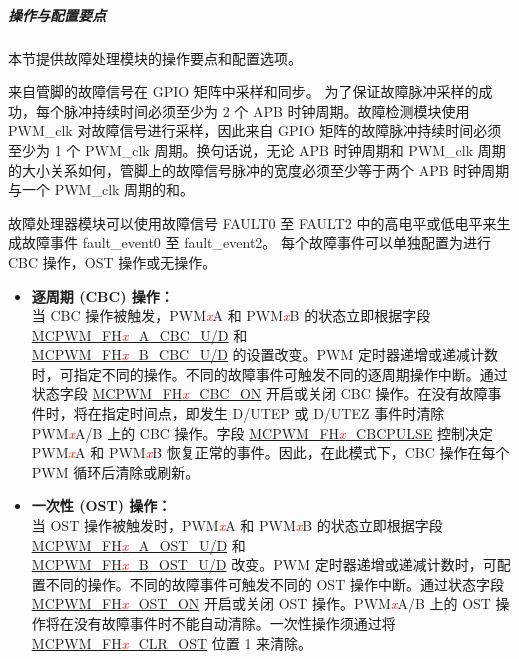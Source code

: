 \documentclass[main\_\_CN.tex]{subfiles}
\begin{document}
\subparagraph{操作与配置要点}
本节提供故障处理模块的操作要点和配置选项。

来自管脚的故障信号在 GPIO 矩阵中采样和同步。 为了保证故障脉冲采样的成功，每个脉冲持续时间必须至少为 2 个 APB 时钟周期。故障检测模块使用 PWM\_clk 对故障信号进行采样，因此来自 GPIO 矩阵的故障脉冲持续时间必须至少为 1 个 PWM\_clk 周期。换句话说，无论 APB 时钟周期和 PWM\_clk 周期的大小关系如何，管脚上的故障信号脉冲的宽度必须至少等于两个 APB 时钟周期与一个 PWM\_clk 周期的和。

故障处理器模块可以使用故障信号 FAULT0 至 FAULT2 中的高电平或低电平来生成故障事件 fault\_event0 至 fault\_event2。 每个故障事件可以单独配置为进行 CBC 操作，OST 操作或无操作。

\begin{itemize}
    \item {\bfseries 逐周期 (CBC) 操作：}\\
    当 CBC 操作被触发，PWM\textcolor{red}{\it{x}}A 和 PWM\textcolor{red}{\it{x}}B 的状态立即根据字段 \hyperref[fielddesc:MCPWMFH0ACBCU]{MCPWM\_FH\textcolor{red}{\it{x}}\_A\_CBC\_U/D} 和 \\\hyperref[fielddesc:MCPWMFH0BCBCU]{MCPWM\_FH\textcolor{red}{\it{x}}\_B\_CBC\_U/D} 的设置改变。PWM 定时器递增或递减计数时，可指定不同的操作。不同的故障事件可触发不同的逐周期操作中断。通过状态字段 \hyperref[fielddesc:MCPWMFH0CBCON]{MCPWM\_FH\textcolor{red}{\it{x}}\_CBC\_ON} 开启或关闭 CBC 操作。在没有故障事件时，将在指定时间点，即发生 D/UTEP 或 D/UTEZ 事件时清除 PWM\textcolor{red}{\it{x}}A/B 上的 CBC 操作。字段 \hyperref[fielddesc:MCPWMFH0CBCPULSE]{MCPWM\_FH\textcolor{red}{\it{x}}\_CBCPULSE} 控制决定 PWM\textcolor{red}{\it{x}}A 和 PWM\textcolor{red}{\it{x}}B 恢复正常的事件。因此，在此模式下，CBC 操作在每个 PWM 循环后清除或刷新。
    \item {\bfseries 一次性 (OST) 操作：}\\
	当 OST 操作被触发时，PWM\textcolor{red}{\it{x}}A 和 PWM\textcolor{red}{\it{x}}B 的状态立即根据字段 \hyperref[fielddesc:MCPWMFH0AOSTU]{MCPWM\_FH\textcolor{red}{\it{x}}\_A\_OST\_U/D} 和 \\\hyperref[fielddesc:MCPWMFH0BOSTU]{MCPWM\_FH\textcolor{red}{\it{x}}\_B\_OST\_U/D} 改变。PWM 定时器递增或递减计数时，可配置不同的操作。不同的故障事件可触发不同的 OST 操作中断。通过状态字段  \hyperref[fielddesc:MCPWMFH0OSTON]{MCPWM\_FH\textcolor{red}{\it{x}}\_OST\_ON} 开启或关闭 OST 操作。PWM\textcolor{red}{\it{x}}A/B 上的 OST 操作将在没有故障事件时不能自动清除。一次性操作须通过将 \hyperref[fielddesc:MCPWMFH0CLROST]{MCPWM\_FH\textcolor{red}{\it{x}}\_CLR\_OST} 位置 1 来清除。
\end{itemize}
\end{document}

